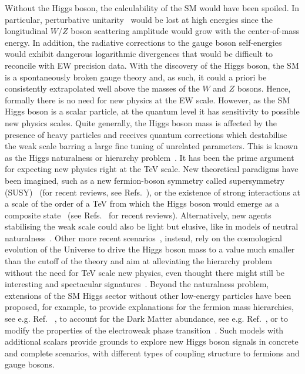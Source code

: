 \documentclass[12pt]{article}
\begin{document}
Without the Higgs boson, the calculability of the SM would have been spoiled. In particular, perturbative unitarity~\cite{PhysRevLett.30.1268,PhysRevD.10.1145,LlewellynSmith:1973yud,PhysRevD.16.1519} would be lost at high energies since the longitudinal $W/Z$ boson scattering amplitude would grow with the center-of-mass energy. In addition, the radiative corrections to the gauge boson self-energies would exhibit dangerous logarithmic divergences that would be difficult to reconcile with EW precision data. With the discovery of the Higgs boson, the SM is a spontaneously broken gauge theory and, as such, it could a priori be consistently extrapolated well above the masses of the $W$ and $Z$ bosons. Hence, formally there is no need for new physics at the EW scale. However, as the SM Higgs boson is a scalar particle, at the quantum level it has sensitivity to possible new physics scales. Quite generally, the Higgs boson mass is affected by the presence of heavy particles and receives quantum corrections which destabilise the weak scale barring a large fine tuning of unrelated parameters. This is known as the Higgs naturalness or hierarchy problem~\cite{PhysRevD.3.1818,tHooft:1980xss}. It has been the prime argument for expecting new physics right at the TeV scale. New theoretical paradigms have been imagined, such as a new fermion-boson symmetry called supersymmetry (SUSY)~\cite{WESS19741} (for recent reviews, see Refs.~\cite{Martin:1997ns,Allanchach:2019wrx}), or the existence of strong interactions at a scale of the order of a TeV from which the Higgs boson would emerge as a composite state~\cite{Georgi:1986im} (see Refs.~\cite{Bellazzini:2014yua,Panico:2015jxa,Csaki:2015hcd} for recent reviews). Alternatively, new agents stabilising the weak scale could also be light but elusive, like in models of neutral naturalness~\cite{Chacko:2005pe,Chacko:2005un,Craig:2015pha,Craig:2014aea}. Other more recent scenarios~\cite{Graham:2015cka,Espinosa:2015eda,Craig:2014aea}, instead, rely on the cosmological evolution of the Universe to drive the Higgs boson mass to a value much smaller than the cutoff of the theory and aim at alleviating the hierarchy problem without the need for TeV scale new physics, even thought there might still be interesting and spectacular signatures~\cite{Graham:2015cka,Espinosa:2015eda,Craig:2014aea,Flacke:2016szy}. Beyond the naturalness problem, extensions of the SM Higgs sector without other low-energy particles have been proposed, for example, to provide explanations for the fermion mass hierarchies, see e.g. Ref. ~\cite{Bauer:2015fxa,Bauer:2015kzy}, to account for the Dark Matter abundance, see e.g. Ref.~\cite{Barbieri:2006dq}, or to modify the properties of the electroweak phase transition~\cite{Morrissey:2012db}. Such models with additional scalars provide grounds to explore new Higgs boson signals in concrete and complete scenarios, with different types of coupling structure to fermions and gauge bosons.
\end{document}
